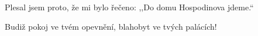 \Rbardot{} Plesal jsem proto, že mi bylo řečeno: ,,Do domu Hospodinova jdeme.``

\Vbardot{} Budiž pokoj ve tvém opevnění, blahobyt ve tvých palácích!
